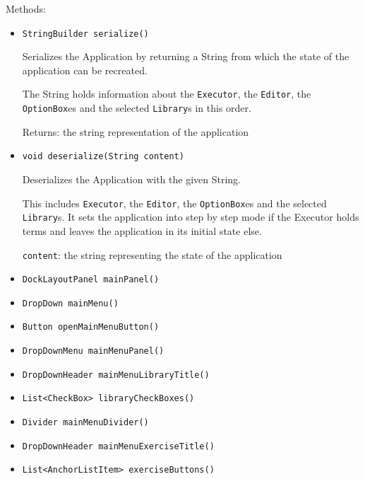 Methods:
\begin{itemize}
\item \texttt{StringBuilder serialize()}

Serializes the Application by returning a String from which the state of
 the application can be recreated.

 The String holds information about the \texttt{Executor}, the
 \texttt{Editor}, the \texttt{OptionBox}es and the selected \texttt{Library}s
 in this order.

Returns: the string representation of the application

\item \texttt{void deserialize(String content)}

Deserializes the Application with the given String.

 This includes \texttt{Executor}, the \texttt{Editor}, the
 \texttt{OptionBox}es and the selected \texttt{Library}s. It sets the
 application into step by step mode if the Executor holds terms and leaves
 the application in its initial state else.

\texttt{content}: the string representing the state of the application

\item \texttt{DockLayoutPanel mainPanel()}



\item \texttt{DropDown mainMenu()}



\item \texttt{Button openMainMenuButton()}



\item \texttt{DropDownMenu mainMenuPanel()}



\item \texttt{DropDownHeader mainMenuLibraryTitle()}



\item \texttt{List<CheckBox> libraryCheckBoxes()}



\item \texttt{Divider mainMenuDivider()}



\item \texttt{DropDownHeader mainMenuExerciseTitle()}



\item \texttt{List<AnchorListItem> exerciseButtons()}




\end{itemize}
